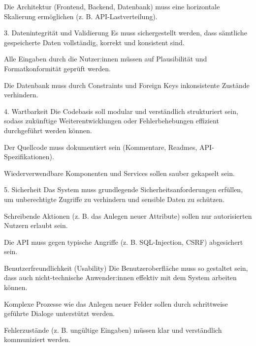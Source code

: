 Die Architektur (Frontend, Backend, Datenbank) muss eine horizontale Skalierung ermöglichen (z. B. API-Lastverteilung).

\large{3. Datenintegrität und Validierung}\break
Es muss sichergestellt werden, dass sämtliche gespeicherte Daten vollständig, korrekt und konsistent sind.

Alle Eingaben durch die Nutzer:innen müssen auf Plausibilität und Formatkonformität geprüft werden.

Die Datenbank muss durch Constraints und Foreign Keys inkonsistente Zustände verhindern.

\large{4. Wartbarkeit} \break
Die Codebasis soll modular und verständlich strukturiert sein, sodass zukünftige Weiterentwicklungen oder Fehlerbehebungen effizient durchgeführt werden können.

Der Quellcode muss dokumentiert sein (Kommentare, Readmes, API-Spezifikationen).

Wiederverwendbare Komponenten und Services sollen sauber gekapselt sein.

\large{5. Sicherheit} \break
Das System muss grundlegende Sicherheitsanforderungen erfüllen, um unberechtigte Zugriffe zu verhindern und sensible Daten zu schützen.

Schreibende Aktionen (z. B. das Anlegen neuer Attribute) sollen nur autorisierten Nutzern erlaubt sein.

Die API muss gegen typische Angriffe (z. B. SQL-Injection, CSRF) abgesichert sein.

Benutzerfreundlichkeit (Usability)
Die Benutzeroberfläche muss so gestaltet sein, dass auch nicht-technische Anwender:innen effektiv mit dem System arbeiten können.

Komplexe Prozesse wie das Anlegen neuer Felder sollen durch schrittweise geführte Dialoge unterstützt werden.

Fehlerzustände (z. B. ungültige Eingaben) müssen klar und verständlich kommuniziert werden.
